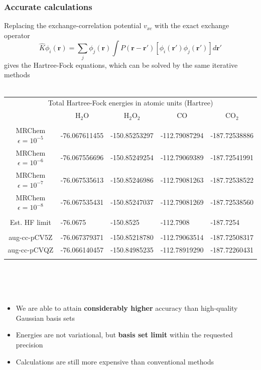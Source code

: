 \begin{frame}
    \frametitle{Accurate calculations}
    \centering
    Replacing the exchange-correlation potential $v_{xc}$ with the exact exchange operator
    \begin{equation}
	\nonumber
	\hat{K}\phi_i(\boldsymbol{r}) = \sum_j \phi_j(\boldsymbol{r}) \int P(\boldsymbol{r}-\boldsymbol{r}')
	    \left[\phi_i(\boldsymbol{r}')\phi_j(\boldsymbol{r}')\right] d\boldsymbol{r}'
    \end{equation}
    gives the Hartree-Fock equations, which can be solved by the same iterative methods
    \ \\
    \ \\
\begin{table}
\tiny
\begin{tabular}{cllll}
\hline   
\hline
\multicolumn{5}{c}{Total Hartree-Fock energies in atomic units (Hartree)}\\
&\multicolumn{1}{c}{H$_2$O}
&\multicolumn{1}{c}{H$_2$O$_2$}
&\multicolumn{1}{c}{CO}
&\multicolumn{1}{c}{CO$_2$}\\
\hline 
            		    &               &               &               &               \\
MRChem $\epsilon=10^{-5}$   & -76.067611455 & -150.85253297 & -112.79087294 & -187.72538886 \\
MRChem $\epsilon=10^{-6}$   & -76.067556696 & -150.85249254 & -112.79069389 & -187.72541991 \\
MRChem $\epsilon=10^{-7}$   & -76.067535613 & -150.85246986 & -112.79081263 & -187.72538522 \\
MRChem $\epsilon=10^{-8}$   & -76.067535431 & -150.85247037 & -112.79081269 & -187.72538560 \\
            		    &               &               &               &               \\
Est. HF limit		    & -76.0675      & -150.8525     & -112.7908     & -187.7254     \\
            		    &               &               &               &               \\
aug-cc-pCV5Z		    & -76.067379371 & -150.85218780 & -112.79063514 & -187.72508317 \\
aug-cc-pCVQZ		    & -76.066140457 & -150.84985235 & -112.78919290 & -187.72260431 \\
            		    &               &               &               &               \\
\hline   
\hline   
\end{tabular}
\end{table}
\ \\
\ \\
\ \\
\begin{itemize}
    \item We are able to attain \textbf{considerably higher} accuracy than high-quality Gaussian basis sets
    \item Energies are not variational, but \textbf{basis set limit} within the requested precision
    \item Calculations are still more expensive than conventional methods
\end{itemize}
\end{frame}


